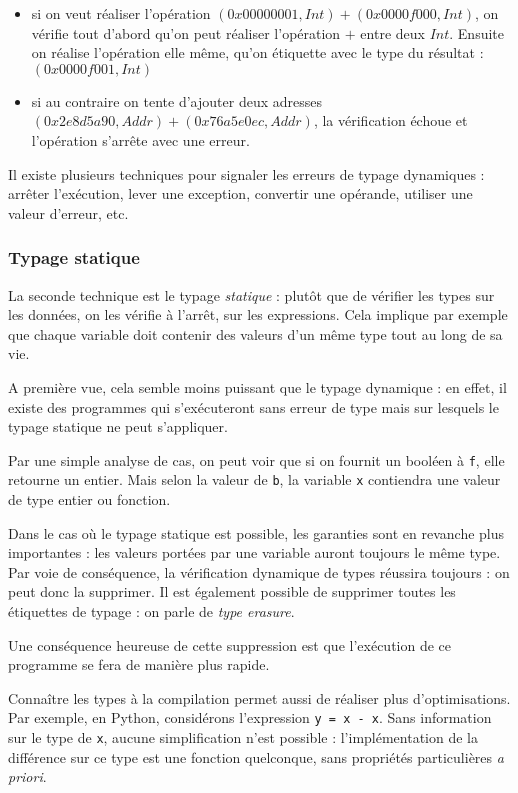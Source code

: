 \begin{itemize}
\item
  si on veut réaliser l'opération
  $(0x00000001, Int) + (0x0000f000, Int)$, on vérifie tout d'abord qu'on
  peut réaliser l'opération $+$ entre deux $Int$. Ensuite on réalise
  l'opération elle même, qu'on étiquette avec le type du résultat :
  $(0x0000f001, Int)$
\item
  si au contraire on tente d'ajouter deux adresses
  $(0x2e8d5a90, Addr) + (0x76a5e0ec, Addr)$, la vérification échoue et
  l'opération s'arrête avec une erreur.
\end{itemize}

Il existe plusieurs techniques pour signaler les erreurs de typage dynamiques :
arrêter l'exécution, lever une exception, convertir une opérande, utiliser une
valeur d'erreur, etc.

\subsubsection{Typage statique}

La seconde technique est le typage \emph{statique} : plutôt que de vérifier les
types sur les données, on les vérifie à l'arrêt, sur les expressions. Cela
implique par exemple que chaque variable doit contenir des valeurs d'un même
type tout au long de sa vie.

A première vue, cela semble moins puissant que le typage dynamique : en effet,
il existe des programmes qui s'exécuteront sans erreur de type mais sur lesquels
le typage statique ne peut s'appliquer.


Par une simple analyse de cas, on peut voir que si on fournit un booléen à
\texttt{f}, elle retourne un entier. Mais selon la valeur de \texttt{b}, la
variable \texttt{x} contiendra une valeur de type entier ou fonction.

Dans le cas où le typage statique est possible, les garanties sont en revanche
plus importantes : les valeurs portées par une variable auront toujours le même
type. Par voie de conséquence, la vérification dynamique de types réussira
toujours : on peut donc la supprimer. Il est également possible de supprimer
toutes les étiquettes de typage : on parle de \emph{type erasure}.

Une conséquence heureuse de cette suppression est que l'exécution de ce
programme se fera de manière plus rapide.

Connaître les types à la compilation permet aussi de réaliser plus
d'optimisations. Par exemple, en Python, considérons l'expression \texttt{y = x
- x}. Sans information sur le type de \texttt{x}, aucune simplification n'est
possible : l'implémentation de la différence sur ce type est une fonction
quelconque, sans propriétés particulières \emph{a priori}.

